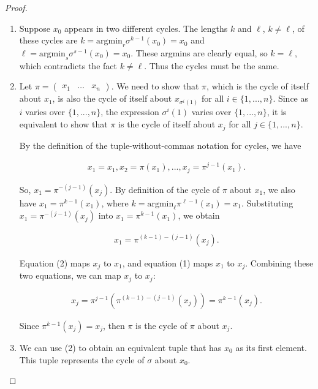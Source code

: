 \begin{proof}
    \mbox{} \\ \indent
    \begin{enumerate}
        \item Suppose $x_0$ appears in two different cycles. The lengths $k$ and $\ell$, $k \neq \ell$, of these cycles are ${k = \text{argmin}_r \sigma^{k - 1}(x_0) = x_0}$ and ${\ell = \text{argmin}_s \sigma^{s - 1}(x_0) = x_0}$. These argmins are clearly equal, so $k = \ell$, which contradicts the fact $k \neq \ell$. Thus the cycles must be the same.
        
        \item Let $\pi = \begin{pmatrix} x_1 & \hdots & x_n \end{pmatrix}$. We need to show that $\pi$, which is the cycle of itself about $x_1$, is also the cycle of itself about $x_{\sigma^i(1)}$ for all $i \in \{1, ..., n\}$. Since as $i$ varies over $\{1, ..., n\}$, the expression $\sigma^i(1)$ varies over $\{1, ..., n\}$, it is equivalent to show that $\pi$ is the cycle of itself about $x_j$ for all $j \in \{1, ..., n\}$.
        
        By the definition of the tuple-without-commas notation for cycles, we have 

        \begin{align*}
            x_1 = x_1, x_2 = \pi(x_1), ..., x_j = \pi^{j - 1}(x_1). \tag{1}
        \end{align*}
        
        So, $x_1 = \pi^{-(j - 1)}(x_j)$. By definition of the cycle of $\pi$ about $x_1$, we also have $x_1 = \pi^{k - 1}(x_1)$, where $k = \text{argmin}_\ell \pi^{\ell - 1}(x_1) = x_1$. Substituting $x_1 = \pi^{-(j - 1)}(x_j)$ into $x_1 = \pi^{k - 1}(x_1)$, we obtain
        
        \begin{align*}
            x_1 = \pi^{(k - 1) - (j - 1)}(x_j). \tag{2}
        \end{align*}

        Equation (2) maps $x_j$ to $x_1$, and equation (1) maps $x_1$ to $x_j$. Combining these two equations, we can map $x_j$ to $x_j$:
        
        \begin{align*}
            x_j = \pi^{j - 1}(\pi^{(k - 1) - (j - 1)}(x_j)) = \pi^{k - 1}(x_j).
        \end{align*}
        
        Since $\pi^{k - 1}(x_j) = x_j$, then $\pi$ is the cycle of $\pi$ about $x_j$.
        
        \item We can use (2) to obtain an equivalent tuple that has $x_0$ as its first element. This tuple represents the cycle of $\sigma$ about $x_0$.
    \end{enumerate}
\end{proof}

